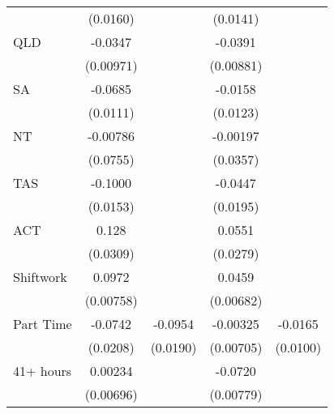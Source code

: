 {\begin{tabular}{l*{4}{c}}
                    &    (0.0160)         &                     &    (0.0141)         &                     \\
[1em]
QLD                 &     -0.0347\sym{***}&                     &     -0.0391\sym{***}&                     \\
                    &   (0.00971)         &                     &   (0.00881)         &                     \\
[1em]
SA                  &     -0.0685\sym{***}&                     &     -0.0158         &                     \\
                    &    (0.0111)         &                     &    (0.0123)         &                     \\
[1em]
NT                  &    -0.00786         &                     &    -0.00197         &                     \\
                    &    (0.0755)         &                     &    (0.0357)         &                     \\
[1em]
TAS                 &     -0.1000\sym{***}&                     &     -0.0447\sym{*}  &                     \\
                    &    (0.0153)         &                     &    (0.0195)         &                     \\
[1em]
ACT                 &       0.128\sym{***}&                     &      0.0551\sym{*}  &                     \\
                    &    (0.0309)         &                     &    (0.0279)         &                     \\
[1em]
Shiftwork           &      0.0972\sym{***}&                     &      0.0459\sym{***}&                     \\
                    &   (0.00758)         &                     &   (0.00682)         &                     \\
[1em]
Part Time           &     -0.0742\sym{***}&     -0.0954\sym{***}&    -0.00325         &     -0.0165         \\
                    &    (0.0208)         &    (0.0190)         &   (0.00705)         &    (0.0100)         \\
[1em]
41+ hours           &     0.00234         &                     &     -0.0720\sym{***}&                     \\
                    &   (0.00696)         &                     &   (0.00779)         &                     \\

\end{tabular}}
